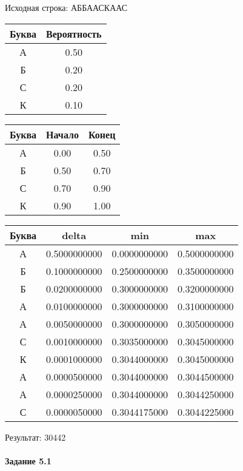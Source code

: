 \documentclass[a4paper, 12pt]{article}
\begin{document}
Исходная строка: АББААСКААС\
\begin{center}
 \begin{tabular}{ |c|c| } 
  \hline
     Буква & Вероятность \\ \hline
А & 0.50\\\hline
Б & 0.20\\\hline
С & 0.20\\\hline
К & 0.10
\\ \hline \end{tabular}
\end{center}
\begin{center}
 \begin{tabular}{ |c|c|c| } 
  \hline
     Буква & Начало & Конец \\ \hline
А & 0.00 & 0.50\\\hline
Б & 0.50 & 0.70\\\hline
С & 0.70 & 0.90\\\hline
К & 0.90 & 1.00
\\ \hline \end{tabular}
\end{center}
\begin{center}
 \begin{tabular}{ |c|c|c|c| } 
  \hline
     Буква & delta & min & max \\ \hline
А & 0.5000000000 & 0.0000000000 & 0.5000000000\\\hline
Б & 0.1000000000 & 0.2500000000 & 0.3500000000\\\hline
Б & 0.0200000000 & 0.3000000000 & 0.3200000000\\\hline
А & 0.0100000000 & 0.3000000000 & 0.3100000000\\\hline
А & 0.0050000000 & 0.3000000000 & 0.3050000000\\\hline
С & 0.0010000000 & 0.3035000000 & 0.3045000000\\\hline
К & 0.0001000000 & 0.3044000000 & 0.3045000000\\\hline
А & 0.0000500000 & 0.3044000000 & 0.3044500000\\\hline
А & 0.0000250000 & 0.3044000000 & 0.3044250000\\\hline
С & 0.0000050000 & 0.3044175000 & 0.3044225000
\\ \hline \end{tabular}
\end{center}
Результат: 30442
\pagebreak
\paragraph{Задание 5.1}
\end{document}
